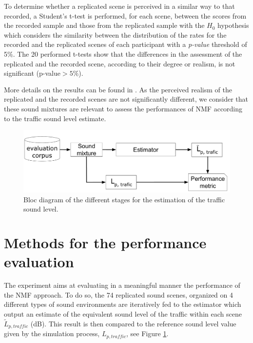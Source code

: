 \documentclass[review,5p,twocolumn,sort&compress,times]{elsarticle}
\begin{document}
To determine whether a replicated scene is perceived in a similar way to that recorded, a Student's t-test is performed, for each scene, between the scores from the recorded sample and those from the replicated sample with the $H_0$ hypothesis which considers the similarity between the distribution of the rates for the recorded and the replicated scenes of each participant with a \textit{p-value} threshold of 5$\%$.  The 20 performed t-tests show that the differences in the assessment of the replicated and the recorded scene, according to their degree or realism, is not significant (p-value$>5\%$).

More details on the results can be found in  \cite{gloaguen_creation_2017}. As the perceived realism of the replicated and the recorded scenes are not significantly different, we consider that  these sound mixtures are relevant to assess the performances of NMF according to the traffic sound level estimate.

\begin{figure}[t]
\centering
\includegraphics[width=0.7\linewidth]{figures/bloc_diagram_estimator.pdf}
\caption{Bloc diagram of the different stages for the estimation of the traffic sound level.}
\label{fig:bloc_diagram_estimator}
\end{figure}

\section{Methods for the performance evaluation}\label{part:expProtocol}

The experiment aims at evaluating in a meaningful manner the performance of the NMF approach. To do so, the 74 replicated sound scenes, organized on 4 different types of sound environments are iteratively fed to the estimator which output an estimate of the equivalent sound level of the traffic within each scene $\tilde{L}_{p, traffic}$ (dB). This result is then compared to the reference sound level value given by the simulation process, $L_{p,traffic}$, see Figure \ref{fig:bloc_diagram_estimator}.
\end{document}
